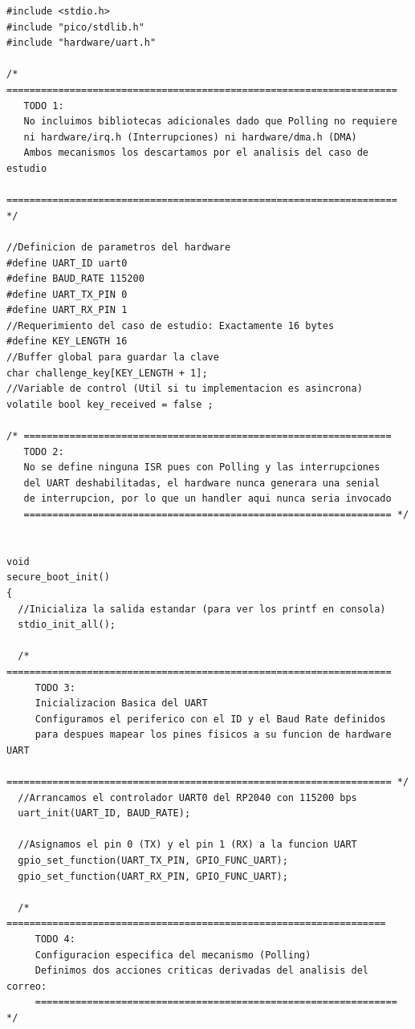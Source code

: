 \documentclass[12pt,letterpaper]{article}
\begin{document}
\begin{lstlisting}[style=modernc, caption={main.c: driver de arranque seguro implementado con Polling}]
#include <stdio.h>
#include "pico/stdlib.h"
#include "hardware/uart.h"

/* ====================================================================
   TODO 1:
   No incluimos bibliotecas adicionales dado que Polling no requiere
   ni hardware/irq.h (Interrupciones) ni hardware/dma.h (DMA)
   Ambos mecanismos los descartamos por el analisis del caso de estudio
   ==================================================================== */

//Definicion de parametros del hardware
#define UART_ID uart0
#define BAUD_RATE 115200
#define UART_TX_PIN 0
#define UART_RX_PIN 1
//Requerimiento del caso de estudio: Exactamente 16 bytes
#define KEY_LENGTH 16
//Buffer global para guardar la clave
char challenge_key[KEY_LENGTH + 1];
//Variable de control (Util si tu implementacion es asincrona)
volatile bool key_received = false ;

/* ================================================================
   TODO 2:
   No se define ninguna ISR pues con Polling y las interrupciones 
   del UART deshabilitadas, el hardware nunca generara una senial 
   de interrupcion, por lo que un handler aqui nunca seria invocado
   ================================================================ */


void
secure_boot_init()
{
  //Inicializa la salida estandar (para ver los printf en consola)
  stdio_init_all();
  
  /* ===================================================================
     TODO 3:
     Inicializacion Basica del UART
     Configuramos el periferico con el ID y el Baud Rate definidos
     para despues mapear los pines fisicos a su funcion de hardware UART
     =================================================================== */
  //Arrancamos el controlador UART0 del RP2040 con 115200 bps
  uart_init(UART_ID, BAUD_RATE);
  
  //Asignamos el pin 0 (TX) y el pin 1 (RX) a la funcion UART
  gpio_set_function(UART_TX_PIN, GPIO_FUNC_UART);
  gpio_set_function(UART_RX_PIN, GPIO_FUNC_UART);
  
  /* ==================================================================
     TODO 4:
     Configuracion especifica del mecanismo (Polling)
     Definimos dos acciones criticas derivadas del analisis del correo:
     =============================================================== */
  

\end{lstlisting}
\end{document}
